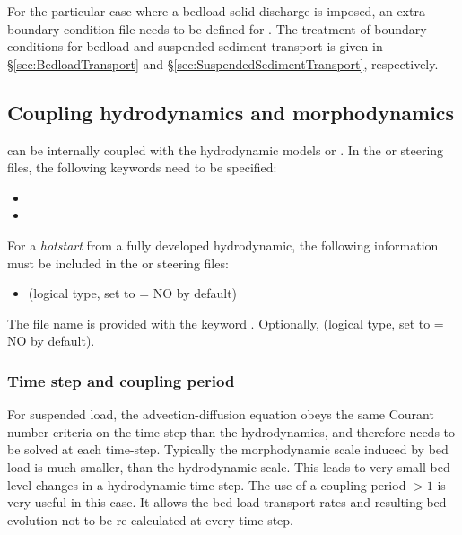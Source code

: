{For the particular case where a bedload solid discharge is imposed, an extra boundary condition file needs to be defined for \sisyphe{}. The treatment of boundary conditions for bedload and suspended sediment transport is given in \S\ref{sec:BedloadTransport} and \S\ref{sec:SuspendedSedimentTransport}, respectively.

\subsection{Coupling hydrodynamics and morphodynamics}
\sisyphe{} can be internally coupled with the hydrodynamic models  or . In the  or  steering files, the following keywords need to be specified:
\begin{itemize}
\item {} 
\item {} 
\end{itemize}
For a \textit{hotstart} from a fully developed hydrodynamic, the following information must be included in the  or  steering files:
\begin{itemize}
\item {} (logical type, set to {\ttfamily = NO} by default)
\end{itemize}
The file name is provided with the keyword . Optionally,  (logical type, set to {\ttfamily = NO} by default).


\subsubsection{Time step and coupling period}
 For suspended load, the advection-diffusion equation obeys the same Courant number criteria on the time step than the hydrodynamics, and therefore needs to be solved at each time-step. Typically the morphodynamic scale induced by bed load is much smaller, than the hydrodynamic scale. This leads to very small bed level changes in a hydrodynamic time step. The use of a coupling period $>1$ is  very useful in this case. It allows the bed load transport rates and resulting bed evolution not to be re-calculated at every time step.

}
